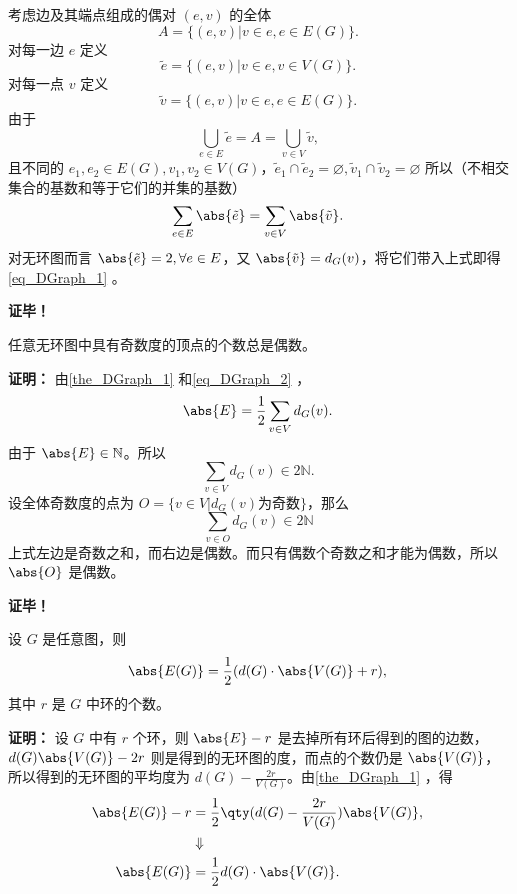 考虑边及其端点组成的偶对 $(e,v)$ 的全体
\begin{equation}
A=\{(e,v)|v\in e,e\in E(G)\}.~
\end{equation}
对每一边 $e$ 定义
\begin{equation}
\tilde e=\{(e,v)|v\in e,v\in V(G)\}.~
\end{equation}
对每一点 $v$ 定义
\begin{equation}
\tilde v=\{(e,v)|v\in e,e\in E(G)\}.~
\end{equation}
由于 
\begin{equation}
\bigcup_{e\in E}\tilde e=A=\bigcup_{v\in V}\tilde v,~
\end{equation}
且不同的 $e_1,e_2\in E(G),v_1,v_2\in V(G)$，$\tilde e_1\cap\tilde e_2=\varnothing,\tilde v_1\cap\tilde v_2=\varnothing$
所以（不相交集合的基数和等于它们的并集的基数）
\begin{equation}
\sum_{e\in E}\abs{\tilde e}=\sum_{v\in V}\abs{\tilde v}.~
\end{equation}
对无环图而言 $\abs{\tilde e}=2,\forall e\in E$，又 $\abs{\tilde v}=d_G(v)$，将它们带入上式即得\autoref{eq_DGraph_1} 。

\textbf{证毕！}

\begin{corollary}{}
任意无环图中具有奇数度的顶点的个数总是偶数。
\end{corollary}
\textbf{证明：}
由\autoref{the_DGraph_1} 和\autoref{eq_DGraph_2} ，
\begin{equation}
\abs{E}=\frac{1}{2}\sum_{v\in V}d_G(v).~
\end{equation}
由于 $\abs{E}\in\mathbb N$。所以 
\begin{equation}
\sum_{v\in V}d_G(v)\in 2\mathbb N.~
\end{equation}
设全体奇数度的点为 $O=\{v\in V|d_G(v)\text{为奇数}\}$，那么
\begin{equation}
\sum_{v\in O}d_G(v)\in 2\mathbb N~
\end{equation}
上式左边是奇数之和，而右边是偶数。而只有偶数个奇数之和才能为偶数，所以 $\abs{O}$ 是偶数。

\textbf{证毕！}

\begin{corollary}{}
设 $G$ 是任意图，则
\begin{equation}
\abs{E(G)}=\frac{1}{2}(d(G)\cdot\abs{V(G)}+r),~
\end{equation}
其中 $r$ 是 $G$ 中环的个数。
\end{corollary}

\textbf{证明：}
设 $G$ 中有 $r$ 个环，则 $\abs{E}-r$ 是去掉所有环后得到的图的边数，$d(G)\abs{V(G)}-2r$ 则是得到的无环图的度，而点的个数仍是 $\abs{V(G)}$，所以得到的无环图的平均度为 $d(G)-\frac{2r}{V(G)}$。由\autoref{the_DGraph_1} ，得
\begin{equation}
\begin{aligned}
\abs{E(G)}-r&=\frac{1}{2}\qty(d(G)-\frac{2r}{V(G)})\abs{V(G)},\\
&\Downarrow\\
\abs{E(G)}&=\frac{1}{2}d(G)\cdot\abs{V(G)}.
\end{aligned}~
\end{equation}

